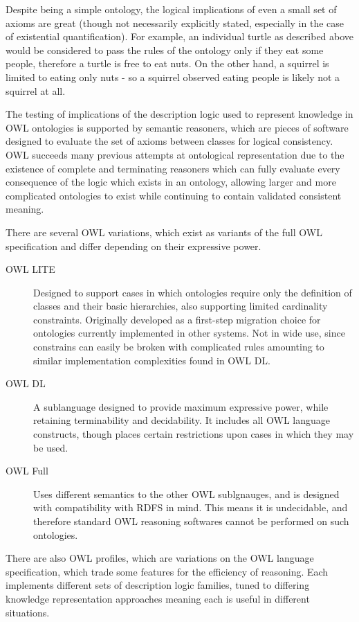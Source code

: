 \documentclass{article}
\begin{document}
Despite being a simple ontology, the logical implications of even a small set of
axioms are great (though not necessarily explicitly stated, especially in the
case of existential quantification). For example, an individual turtle as described 
above would be considered to pass the rules of the ontology only if they eat some 
people, therefore a turtle is free to eat nuts. On the other hand, a squirrel is limited
to eating only nuts - so a squirrel observed eating people is likely not a
squirrel at all.

The testing of implications of the description logic used to represent
knowledge in OWL ontologies is supported by semantic reasoners, which are 
pieces of software designed to evaluate the set of axioms between classes for 
logical consistency. OWL succeeds many previous attempts at ontological 
representation due to the existence of complete and terminating reasoners 
which can fully evaluate every consequence of the logic which exists in an 
ontology, allowing larger and more complicated ontologies to exist while 
continuing to contain validated consistent meaning.

There are several OWL variations, which exist as variants of the full OWL
specification and differ depending on their expressive power.

\begin{description}
    \item[OWL LITE] Designed to support cases in which ontologies require only
    the definition of classes and their basic hierarchies, also supporting
    limited cardinality constraints. Originally developed as a first-step
    migration choice for ontologies currently implemented in other systems. Not
    in wide use, since constrains can easily be broken with complicated rules
    amounting to similar implementation complexities found in OWL DL.
    \item[OWL DL] A sublanguage designed to provide maximum expressive power,
    while retaining terminability and decidability. It includes all OWL language
    constructs, though places certain restrictions upon cases in which they may
    be used. 
    \item[OWL Full] Uses different semantics to the other OWL sublgnauges, and
    is designed with compatibility with RDFS in mind. This means it is
    undecidable, and therefore standard OWL reasoning softwares cannot be
    performed on such ontologies.
\end{description}

There are also OWL profiles\cite{owlprofiles}, which are variations on the OWL
language specification, which trade some features for the efficiency of reasoning.
Each implements different sets of description logic families, tuned to differing
knowledge representation approaches meaning each is useful in different situations.
\end{document}
